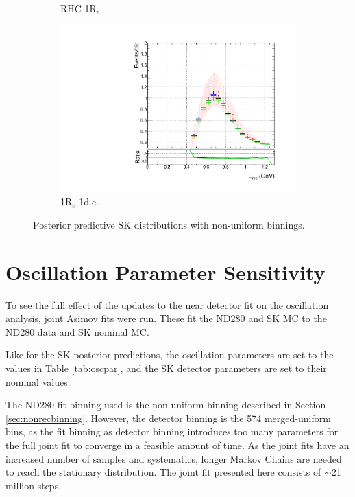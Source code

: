\begin{figure}
\begin{subfigure}{.49\textwidth}
   \caption{RHC 1R$_{e}$}
  \label{fig:skppnuebar}
  \end{subfigure}
\begin{subfigure}{.49\textwidth}
  \centering
  \includegraphics[width=0.95\linewidth]{figs/polySKnue1pi}
   \caption{1R$_{e}$ 1d.e.}
  \label{fig:skppnue1pi}
\end{subfigure}
\caption{Posterior predictive SK distributions with non-uniform binnings.}
\label{fig:skpppoly}
\end{figure}

\section{Oscillation Parameter Sensitivity}\label{sec:oscpar}

To see the full effect of the updates to the near detector fit on the oscillation analysis, joint Asimov fits were run. These fit the ND280 and SK MC to the ND280 data and SK nominal MC. 

Like for the SK posterior predictions, the oscillation parameters are set to the values in Table \ref{tab:oscpar}, and the SK detector parameters are set to their nominal values. 

The ND280 fit binning used is the non-uniform binning described in Section \ref{sec:nonrecbinning}. However, the detector binning is the 574 merged-uniform bins, as the fit binning as detector binning introduces too many parameters for the full joint fit to converge in a feasible amount of time. As the joint fits have an increased number of samples and systematics, longer Markov Chains are needed to reach the stationary distribution. The joint fit presented here consists of $\sim$21 million steps. 

